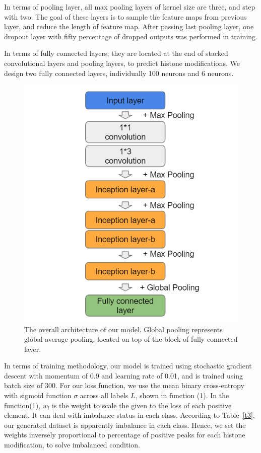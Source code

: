 In terms of pooling layer, all max pooling layers of kernel size are three, and step with two. The goal of these layers is to sample the feature maps from previous layer, and reduce the length of feature map. After passing last pooling layer, one dropout layer with fifty percentage of dropped outputs was performed in training.

In terms of fully connected layers, they are located at the end of stacked convolutional layers and pooling layers, to predict histone modifications. We design two fully connected layers, individually 100 neurons and 6 neurons.

\begin{figure}[H]
    \centering
    \includegraphics[width=0.7\columnwidth]{body/figure/figure12.png}
    \captionsetup{labelfont=bf}
    \renewcommand{\baselinestretch}{1.0}
    \caption[Complete architecture]{The overall architecture of our model. Global pooling represents global average pooling, located on top of the block of fully connected layer.}
    \label{f12}
\end{figure}

In terms of training methodology, our model is trained using stochastic gradient descent with momentum of 0.9 and learning rate of 0.01, and is trained using batch size of 300. For our loss function, we use the mean binary cross-entropy with sigmoid function \(\sigma\) across all labels $L$, shown in function (1). In the function(1), $w_l$ is the weight to scale the given to the loss of each positive element. It can deal with imbalance status in each class. According to Table~\ref{t3}, our generated dataset is apparently imbalance in each class. Hence, we set the weights inversely proportional to percentage of positive peaks for each histone modification, to solve imbalanced condition.

